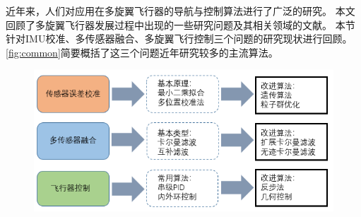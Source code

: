 \documentclass[
  type=master
]{gdutthesis}
\begin{document}


%

近年来，人们对应用在多旋翼飞行器的导航与控制算法进行了广泛的研究。
本文回顾了多旋翼飞行器发展过程中出现的一些研究问题及其相关领域的文献。
本节针对IMU校准、多传感器融合、多旋翼飞行控制三个问题的研究现状进行回顾。
\autoref{fig:common}简要概括了这三个问题近年研究较多的主流算法\cite{mahony2008nonlinear,tedaldi2014robust,lee2010geometric,sarkka2017multi,benziane2016attitude,刘烨秋2019基于非线性观测器的飞行器姿态控制方法与应用,王成2018四旋翼无人机飞行控制算法综述,李轾2020两种欠驱动系统的非线性控制方法研究}。
\begin{figure}[H]
	\centering
	\includegraphics[width=1.0\textwidth]{屏幕截图 2022-06-08 092121.png}
	\label{fig:common}
\end{figure}
\end{document}
